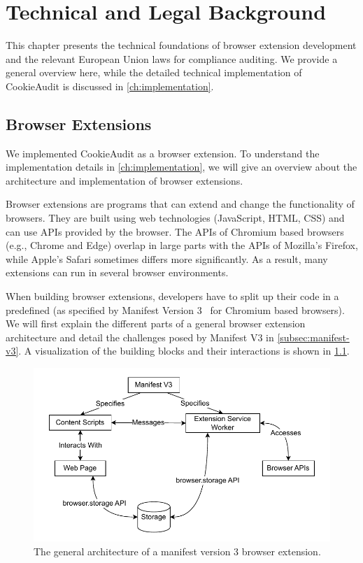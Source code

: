\chapter{Technical and Legal Background}

This chapter presents the technical foundations of browser extension development and the relevant European Union laws for compliance auditing. We provide a general overview here, while the detailed technical implementation of CookieAudit is discussed in \cref{ch:implementation}.

\section{Browser Extensions}
We implemented CookieAudit as a browser extension.
To understand the implementation details in \cref{ch:implementation}, we will give an overview about the architecture and implementation of browser extensions.

Browser extensions are programs that can extend and change the functionality of browsers.
They are built using web technologies (JavaScript, HTML, CSS) and can use APIs provided by the browser.
The APIs of Chromium based browsers (e.g., Chrome and Edge) overlap in large parts with the APIs of Mozilla's Firefox, while Apple's Safari sometimes differs more significantly.
As a result, many extensions can run in several browser environments.

When building browser extensions, developers have to split up their code in a predefined (as specified by Manifest Version 3~\cite{manifestv3} for Chromium based browsers).
We will first explain the different parts of a general browser extension architecture and detail the challenges posed by Manifest V3 in \cref{subsec:manifest-v3}.
A visualization of the building blocks and their interactions is shown in \cref{fig:extension-architecture}.

\begin{figure}
	\centering
	\includegraphics[width=\textwidth]{media/browser-extension-architecture.drawio.pdf}
    \caption{The general architecture of a manifest version 3 browser extension.}
    \label{fig:extension-architecture}
\end{figure}

